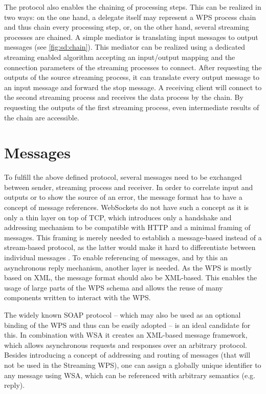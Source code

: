   The protocol also enables the chaining of processing steps. This can be realized in two ways: on the one hand, a delegate itself may represent a \ac{WPS} process chain and thus chain every processing step, or, on the other hand, several streaming processes are chained. A simple mediator is translating input messages to output messages (see \cref{fig:sd:chain}). This mediator can be realized using a dedicated streaming enabled algorithm accepting an input/output mapping and the connection parameters of the streaming processes to connect. After requesting the outputs of the source streaming process, it can translate every output message to an input message and forward the stop message. A receiving client will connect to the second streaming process and receives the data process by the chain. By requesting the outputs of the first streaming process, even intermediate results of the chain are accessible.

\section{Messages}
  \label{sec:streaming:messages}
  To fulfill the above defined protocol, several messages need to be exchanged between sender, streaming process and receiver. In order to correlate input and outputs or to show the source of an error, the message format has to have a concept of message references. WebSockets do not have such a concept as it is only a thin layer on top of TCP, which introduces only a handshake and addressing mechanism to be compatible with HTTP and a minimal framing of messages. This framing is merely needed to establish a message-based instead of a stream-based protocol, as the latter would make it hard to differentiate between individual messages \citep{ietf:rfc6455}. To enable referencing of messages, and by this an asynchronous reply mechanism, another layer is needed. As the \ac{WPS} is mostly based on \ac{XML}, the message format should also be \ac{XML}-based. This enables the usage of large parts of the \ac{WPS} schema and allows the reuse of many components written to interact with the \ac{WPS}.

  The widely known SOAP protocol \citep{w3c:soap1} -- which may also be used as an optional binding of the \ac{WPS} \citep{ogc:wps} and thus can be easily adopted -- is an ideal candidate for this. In combination with \ac{WSA} \citep{w3c:wsa} it creates an \ac{XML}-based message framework, which allows asynchronous requests and responses over an arbitrary protocol. Besides introducing a concept of addressing and routing of messages (that will not be used in the Streaming \ac{WPS}), one can assign a globally unique identifier to any message using \ac{WSA}, which can be referenced with arbitrary semantics (e.g. reply).

